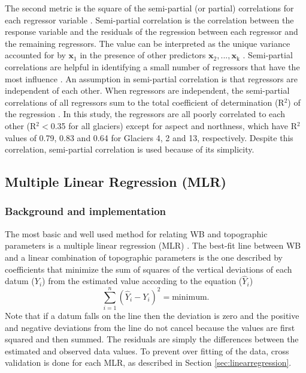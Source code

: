 \documentclass{sfuthesis}
\renewcommand{\vector}[1]{\mathbf{#1}}
\begin{document}
The second metric is the square of the semi-partial (or partial) correlations for each regressor variable \citep{Gromping2015}. Semi-partial correlation is the correlation between the response variable and the residuals of the regression between each regressor and the remaining regressors. The value can be interpreted as the unique variance accounted for by $\vector{x}_1$ in the presence of other predictors $\vector{x}_2,...,\vector{x}_\mathrm{k}$ \citep{Darlington1968, Bring1996}. Semi-partial correlations are helpful in identifying a small number of regressors that have the most influence \citep{Gromping2009}. An assumption in semi-partial correlation is that regressors are independent of each other. When regressors are independent, the semi-partial correlations of all regressors sum to the total coefficient of determination (R$^2$) of the regression  \citep{Gromping2015}. In this study, the regressors are all poorly correlated to each other (R$^2<$0.35 for all glaciers) except for aspect and northness, which have R$^2$ values of 0.79, 0.83 and 0.64 for Glaciers 4, 2 and 13, respectively. Despite this correlation, semi-partial correlation is used because of its simplicity. 

\subsection{Multiple Linear Regression (MLR)}
\label{sec:MLR}

\subsubsection{Background and implementation}

The most basic and well used method for relating WB and topographic parameters is a multiple linear regression (MLR) \citep[e.g.][]{Cohen2013}. The best-fit line between WB and a linear combination of topographic parameters is the one described by coefficients that minimize the sum of squares of the vertical deviations of each datum ($Y_i$) from the estimated value according to the equation ($\hat{Y}_i$) \citep{Davis1986}
\begin{equation}
\sum^n_{i=1}(\hat{Y}_i-Y_i)^2 = \mathrm{minimum}.
\end{equation}
Note that if a datum falls on the line then the deviation is zero and  the positive and negative deviations from the line do not cancel because the values are first squared and then summed. The residuals are simply the differences between the estimated and observed data values. To prevent over fitting of the data, cross validation is done for each MLR, as described in Section \ref{sec:linearregression}.
\end{document}
